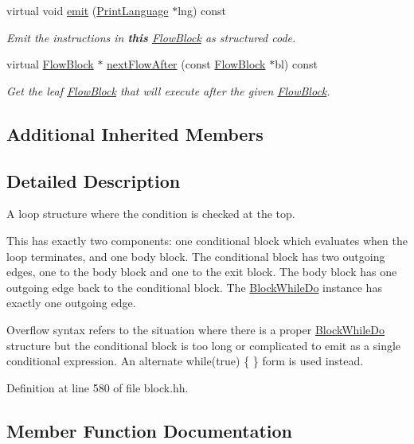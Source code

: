 \begin{DoxyCompactItemize}
virtual void \mbox{\hyperlink{class_block_while_do_a8596786848701d23bc4e4a7fc3730889}{emit}} (\mbox{\hyperlink{class_print_language}{Print\+Language}} $\ast$lng) const
\begin{DoxyCompactList}\small\item\em Emit the instructions in {\bfseries{this}} \mbox{\hyperlink{class_flow_block}{Flow\+Block}} as structured code. \end{DoxyCompactList}\item 
virtual \mbox{\hyperlink{class_flow_block}{Flow\+Block}} $\ast$ \mbox{\hyperlink{class_block_while_do_a28f4f91e7ec3b4cc2bde0a0d432e0fe8}{next\+Flow\+After}} (const \mbox{\hyperlink{class_flow_block}{Flow\+Block}} $\ast$bl) const
\begin{DoxyCompactList}\small\item\em Get the leaf \mbox{\hyperlink{class_flow_block}{Flow\+Block}} that will execute after the given \mbox{\hyperlink{class_flow_block}{Flow\+Block}}. \end{DoxyCompactList}\end{DoxyCompactItemize}
\subsection*{Additional Inherited Members}


\subsection{Detailed Description}
A loop structure where the condition is checked at the top. 

This has exactly two components\+: one conditional block which evaluates when the loop terminates, and one body block. The conditional block has two outgoing edges, one to the body block and one to the exit block. The body block has one outgoing edge back to the conditional block. The \mbox{\hyperlink{class_block_while_do}{Block\+While\+Do}} instance has exactly one outgoing edge.

Overflow syntax refers to the situation where there is a proper \mbox{\hyperlink{class_block_while_do}{Block\+While\+Do}} structure but the conditional block is too long or complicated to emit as a single conditional expression. An alternate {\ttfamily while(true) \{ \}} form is used instead. 

Definition at line 580 of file block.\+hh.



\subsection{Member Function Documentation}
\mbox{\label{class_block_while_do_a8596786848701d23bc4e4a7fc3730889}} 
